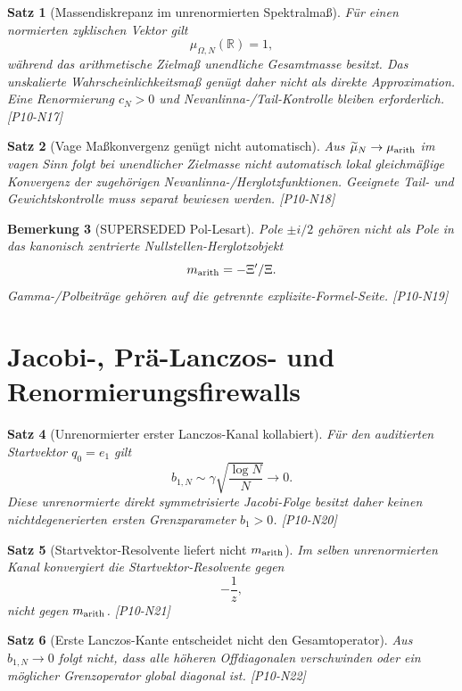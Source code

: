 \documentclass[11pt,a4paper]{amsart}
\newtheorem{theorem}{Satz}[section]
\newtheorem{remark}[theorem]{Bemerkung}
\begin{document}
\begin{theorem}[Massendiskrepanz im unrenormierten Spektralmaß]
\label{thm:n17}
Für einen normierten zyklischen Vektor gilt
\[
  \mu_{\Omega,N}(\mathbb R)=1,
\]
während das arithmetische Zielmaß unendliche Gesamtmasse besitzt. Das
unskalierte Wahrscheinlichkeitsmaß genügt daher nicht als direkte
Approximation. Eine Renormierung $c_N>0$ und Nevanlinna-/Tail-Kontrolle bleiben
erforderlich. \emph{[P10-N17]}
\end{theorem}

\begin{theorem}[Vage Maßkonvergenz genügt nicht automatisch]
\label{thm:n18}
Aus $\widetilde\mu_N\to\mu_{\rm arith}$ im vagen Sinn folgt bei unendlicher
Zielmasse nicht automatisch lokal gleichmäßige Konvergenz der zugehörigen
Nevanlinna-/Herglotzfunktionen. Geeignete Tail- und Gewichtskontrolle muss
separat bewiesen werden. \emph{[P10-N18]}
\end{theorem}

\begin{remark}[SUPERSEDED Pol-Lesart]\label{rem:n19}
Pole $\pm i/2$ gehören nicht als Pole in das kanonisch zentrierte
Nullstellen-Herglotzobjekt
\[
  m_{\rm arith}=-\Xi'/\Xi.
\]
Gamma-/Polbeiträge gehören auf die getrennte explizite-Formel-Seite.
\emph{[P10-N19]}
\end{remark}

\section{Jacobi-, Prä-Lanczos- und Renormierungsfirewalls}

\begin{theorem}[Unrenormierter erster Lanczos-Kanal kollabiert]
\label{thm:n20}
Für den auditierten Startvektor $q_0=e_1$ gilt
\[
  b_{1,N}\sim\gamma\sqrt{\frac{\log N}{N}}\to0.
\]
Diese unrenormierte direkt symmetrisierte Jacobi-Folge besitzt daher keinen
nichtdegenerierten ersten Grenzparameter $b_1>0$. \emph{[P10-N20]}
\end{theorem}

\begin{theorem}[Startvektor-Resolvente liefert nicht $m_{\rm arith}$]
\label{thm:n21}
Im selben unrenormierten Kanal konvergiert die Startvektor-Resolvente gegen
\[
  -\frac1z,
\]
nicht gegen $m_{\rm arith}$. \emph{[P10-N21]}
\end{theorem}

\begin{theorem}[Erste Lanczos-Kante entscheidet nicht den Gesamtoperator]
\label{thm:n22}
Aus $b_{1,N}\to0$ folgt nicht, dass alle höheren Offdiagonalen verschwinden
oder ein möglicher Grenzoperator global diagonal ist. \emph{[P10-N22]}
\end{theorem}
\end{document}
